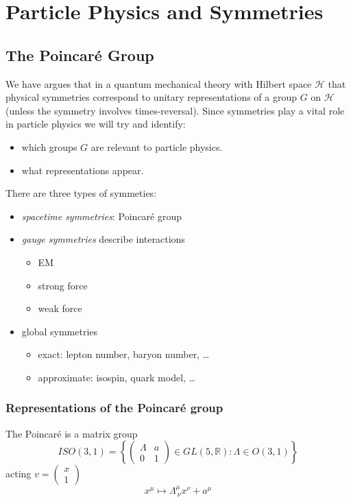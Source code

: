 \chapter{Particle Physics and Symmetries}
\section{The Poincar\'e Group}
We have argues that in a quantum mechanical theory with Hilbert space $\mathcal{H}$ that physical symmetries correspond to unitary representations of a group $G$ on $\mathcal{H}$ (unless the symmetry involves times-reversal). Since symmetries play a vital role in particle physics we will try and identify:
\begin{itemize}
    \item which groups $G$ are relevant to particle physics.
    \item what representations appear.
\end{itemize}
There are three types of symmeties:
\begin{itemize}
    \item \textit{spacetime symmetries}: Poincar\'e group
    \item \textit{gauge symmetries} describe interactions
    \begin{itemize}
        \item EM
        \item strong force
        \item weak force
    \end{itemize}
    \item global symmetries
    \begin{itemize}
        \item exact: lepton number, baryon number, \dots
        \item approximate: isospin, quark model, \dots
    \end{itemize}
\end{itemize}

\subsection{Representations of the Poincar\'e group}
The Poincar\'e is a matrix group 
\begin{equation}
    ISO(3,1) = \left\{\begin{pmatrix}
        \Lambda & a \\
        0 & 1
    \end{pmatrix}\in GL(5,\mathbb{R}): \Lambda \in O(3,1)\right\}
\end{equation}
acting $v = \begin{pmatrix}
    x\\
    1
\end{pmatrix}$
\begin{equation}
    x^{\mu}\mapsto \Lambda^{\mu}_{\ \nu}x^{\nu} + a^{\mu}
\end{equation}

